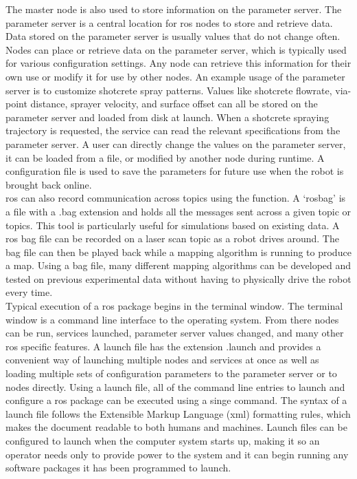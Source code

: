The master node is also used to store information on the parameter server. The parameter server is a central location for \acrshort{ros} nodes to store and retrieve data. Data stored on the parameter server is usually values that do not change often. Nodes can place or retrieve data on the parameter server, which is typically used for various configuration settings. Any node can retrieve this information for their own use or modify it for use by other nodes. An example usage of the parameter server is to customize shotcrete spray patterns. Values like shotcrete flowrate, via-point distance, sprayer velocity, and surface offset can all be stored on the parameter server and loaded from disk at launch. When a shotcrete spraying trajectory is requested, the service can read the relevant specifications from the parameter server. A user can directly change the values on the parameter server, it can be loaded from a file, or modified by another node during runtime. A configuration file is used to save the parameters for future use when the robot is brought back online.\\

\acrshort{ros} can also record communication across topics using the  function. A `rosbag' is a file with a .bag extension and holds all the messages sent across a given topic or topics. This tool is particularly useful for simulations based on existing data. A \acrshort{ros} bag file can be recorded on a laser scan topic as a robot drives around. The bag file can then be played back while a mapping algorithm is running to produce a map. Using a bag file, many different mapping algorithms can be developed and tested on previous experimental data without having to physically drive the robot every time.\\

Typical execution of a \acrshort{ros} package begins in the terminal window. The terminal window is a command line interface to the operating system. From there nodes can be run, services launched, parameter server values changed, and many other \acrshort{ros} specific features. A launch file has the extension .launch and provides a convenient way of launching multiple nodes and services at once as well as loading multiple sets of configuration parameters to the parameter server or to nodes directly. Using a launch file, all of the command line entries to launch and configure a \acrshort{ros} package can be executed using a singe command. The syntax of a launch file follows the Extensible Markup Language (\acrshort{xml}) formatting rules, which makes the document readable to both humans and machines. Launch files can be configured to launch when the computer system starts up, making it so an operator needs only to provide power to the system and it can begin running any software packages it has been programmed to launch.\\